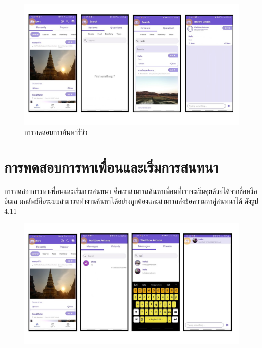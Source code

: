 \begin{figure}
    \begin{center}
      \includegraphics[width=1\textwidth]{./image/testing/Slide11.JPG}
    \end{center}
    \caption[การทดสอบการค้นหารีวิว]{การทดสอบการค้นหารีวิว}
    \end{figure}

\section{การทดสอบการหาเพื่อนและเริ่มการสนทนา}
\quad \quad การทดสอบการหาเพื่อนและเริ่มการสนทนา คือเราสามารถค้นหาเพื่อนที่เราจะเริ่มคุยด้วยได้จากชื่อหรืออีเมล
ผลลัพธ์คือระบบสามารถทำงานค้นหาได้อย่างถูกต้องและสามารถส่งข้อความหาคู่สนทนาได้  ดังรูป 4.11

\begin{figure}
    \begin{center}
      \includegraphics[width=1\textwidth]{./image/testing/Slide12.JPG}
    \end{center}
    \end{figure}


